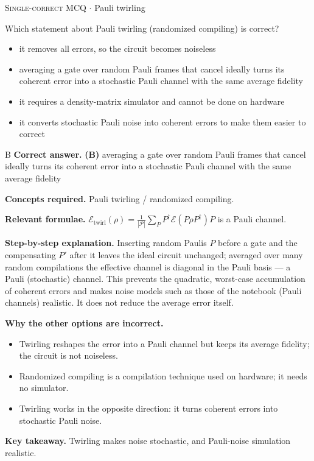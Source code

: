 \documentclass[11pt,a4paper]{article}
\newcommand{\optlabel}[1]{\textbf{(#1)}}
\newcommand{\correctlabel}[1]{\textcolor{okgreen}{\textbf{(#1)}\,\ding{51}}}
\newenvironment{qitem}[1]{\begin{list}{}{\setlength{\leftmargin}{3.3em}\setlength{\labelwidth}{3.1em}%
  \setlength{\labelsep}{0.2em}\setlength{\topsep}{3pt}\setlength{\parsep}{3pt}}\item[\textbf{Q.#1}\hfill]}{\end{list}}
\newcommand{\qsep}{\par\vspace{2pt}{\color{black!15}\hrule}\vspace{4pt}}
\newcommand{\qmeta}[2]{{\footnotesize\color{black!60}\textsc{#1} \;$\cdot$\; #2}\par}
\begin{document}
\begin{qitem}{73}
\qmeta{Single-correct MCQ}{Pauli twirling}
Which statement about Pauli twirling (randomized compiling) is correct?
\begin{itemize}[leftmargin=2.6em, labelsep=0.4em, itemsep=2pt, topsep=3pt]
\item[\optlabel{A}] it removes all errors, so the circuit becomes noiseless
\item[\correctlabel{B}] averaging a gate over random Pauli frames that cancel ideally turns its coherent error into a stochastic Pauli channel with the same average fidelity
\item[\optlabel{C}] it requires a density-matrix simulator and cannot be done on hardware
\item[\optlabel{D}] it converts stochastic Pauli noise into coherent errors to make them easier to correct
\end{itemize}
\end{qitem}
\begin{solbox}{B}
\textbf{\color{brand}Correct answer.} \textcolor{okgreen}{\textbf{(B)}} averaging a gate over random Pauli frames that cancel ideally turns its coherent error into a stochastic Pauli channel with the same average fidelity

\textbf{\color{brand}Concepts required.} Pauli twirling / randomized compiling.

\textbf{\color{brand}Relevant formulae.} $\mathcal E_{\text{twirl}}(\rho) = \frac1{|\mathcal P|}\sum_PP^\dagger\mathcal E(P\rho P^\dagger)P$ is a Pauli channel.

\textbf{\color{brand}Step-by-step explanation.} Inserting random Paulis $P$ before a gate and the compensating $P'$ after it leaves the ideal circuit unchanged; averaged over many random compilations the
effective channel is diagonal in the Pauli basis --- a Pauli (stochastic) channel. This prevents the quadratic, worst-case accumulation of coherent errors and makes
noise models such as those of the notebook (Pauli channels) realistic. It does not reduce the average error itself.

\textbf{\color{brand}Why the other options are incorrect.}
\begin{itemize}[leftmargin=2.4em, itemsep=1pt, topsep=2pt]
\item[\textbf{(A)}] Twirling reshapes the error into a Pauli channel but keeps its average fidelity; the circuit is not noiseless.
\item[\textbf{(C)}] Randomized compiling is a compilation technique used on hardware; it needs no simulator.
\item[\textbf{(D)}] Twirling works in the opposite direction: it turns coherent errors into stochastic Pauli noise.
\end{itemize}
\textbf{\color{brand}Key takeaway.} Twirling makes noise stochastic, and Pauli-noise simulation realistic.
\end{solbox}
\qsep
\end{document}
